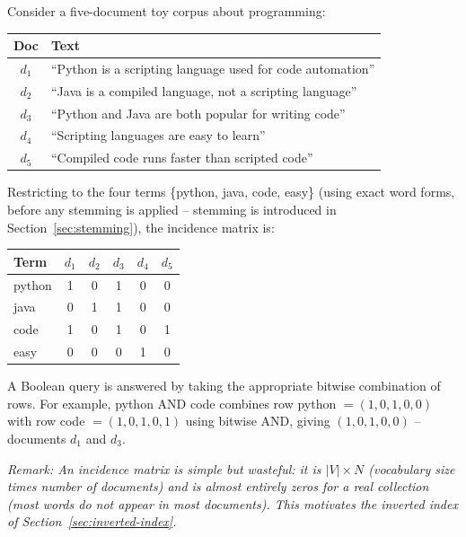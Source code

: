 \documentclass[11pt, a4paper]{article}
\newcommand{\Note}[1]{\par\noindent\textit{\color{darkgray}Remark: #1}\par}
\begin{document}
\begin{examplebox}
Consider a five-document toy corpus about programming:

\begin{center}
\begin{tabular}{@{}cl@{}}
\toprule
Doc & Text \\
\midrule
$d_1$ & ``Python is a scripting language used for code automation'' \\
$d_2$ & ``Java is a compiled language, not a scripting language'' \\
$d_3$ & ``Python and Java are both popular for writing code'' \\
$d_4$ & ``Scripting languages are easy to learn'' \\
$d_5$ & ``Compiled code runs faster than scripted code'' \\
\bottomrule
\end{tabular}
\end{center}

Restricting to the four terms \{\textsf{python}, \textsf{java}, \textsf{code}, \textsf{easy}\} (using exact word forms, before any stemming is applied -- stemming is introduced in Section~\ref{sec:stemming}), the incidence matrix is:

\begin{center}
\begin{tabular}{@{}lccccc@{}}
\toprule
Term & $d_1$ & $d_2$ & $d_3$ & $d_4$ & $d_5$ \\
\midrule
python & 1 & 0 & 1 & 0 & 0 \\
java   & 0 & 1 & 1 & 0 & 0 \\
code   & 1 & 0 & 1 & 0 & 1 \\
easy   & 0 & 0 & 0 & 1 & 0 \\
\bottomrule
\end{tabular}
\end{center}

A Boolean query is answered by taking the appropriate bitwise combination of rows. For example, \textsf{python AND code} combines row \textsf{python} $= (1,0,1,0,0)$ with row \textsf{code} $=(1,0,1,0,1)$ using bitwise AND, giving $(1,0,1,0,0)$ -- documents $d_1$ and $d_3$.
\end{examplebox}

\Note{An incidence matrix is simple but wasteful: it is $|V|\times N$ (vocabulary size times number of documents) and is almost entirely zeros for a real collection (most words do not appear in most documents). This motivates the inverted index of Section~\ref{sec:inverted-index}.}
\end{document}
